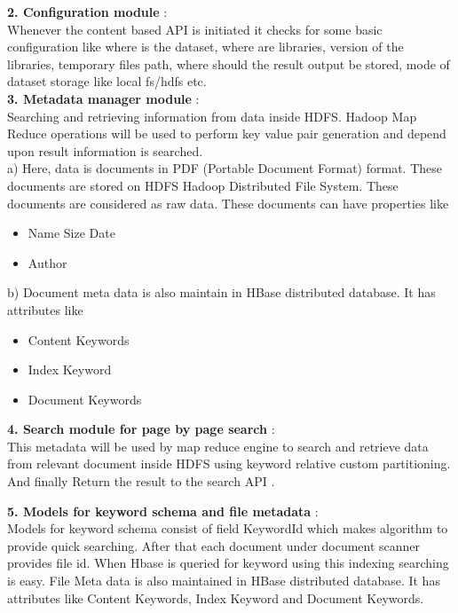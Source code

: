\documentclass[oneside,a4paper,12pt]{report}
\begin{document}
{\begin{appendices}
\noindent \textbf{2.	Configuration module} :  \\
Whenever the content based API is initiated it checks for some basic configuration like where is the dataset, where are libraries, version of the libraries, temporary files path, where should the result output be stored, mode of dataset storage like local fs/hdfs  etc.\\


\noindent \textbf{3.	Metadata manager module } : \\
Searching and retrieving information from data inside HDFS. Hadoop Map Reduce operations will be used to perform key value pair generation and depend upon result information is searched. \\

\noindent a) Here, data is documents in PDF (Portable Document Format) format. These documents are stored on HDFS Hadoop Distributed File System. These documents are considered as raw data. These documents can have properties like 

\begin{itemize}
\item Name Size Date 
\item Author 
\end{itemize}

\noindent b)	Document meta data is also maintain in HBase distributed database. It has attributes like 
\begin{itemize}
\item Content Keywords
\item Index Keyword 
\item Document Keywords 
\end{itemize}

\noindent \textbf{4.	Search module for page by page search} : \\
This metadata will be used by map reduce engine to search and retrieve data from relevant document inside HDFS using keyword relative custom partitioning. And finally
Return the result to the search API .

\noindent \textbf{5.	Models for keyword schema and file metadata} : \\
Models for keyword schema consist of field KeywordId which makes algorithm to provide quick searching. After that each document under document scanner provides file id. When Hbase is queried for keyword using this indexing searching is easy.
File Meta data is also maintained in HBase distributed database. It has attributes like Content Keywords, Index Keyword and Document Keywords.




\end{appendices}}
\end{document}
